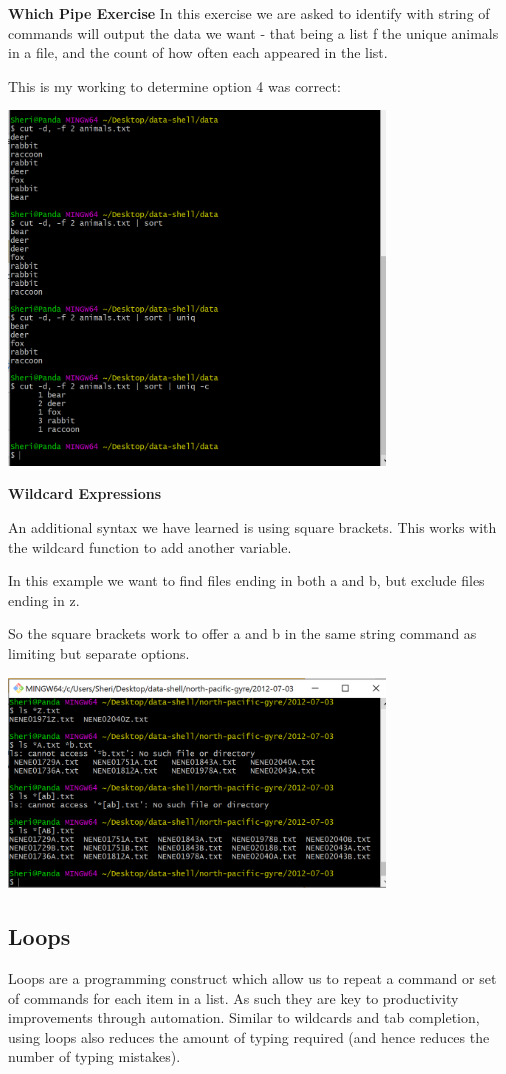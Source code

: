 \documentclass{article}
\begin{document}
\textbf{Which Pipe Exercise}
In this exercise we are asked to identify with string of commands will output the data we want - that being a list f the unique animals in a file, and the count of how often each appeared in the list. 

This is my working to determine option 4 was correct:

\includegraphics[width=10cm]{Images/GitBash_041.PNG}

\textbf{Wildcard Expressions}

An additional syntax we have learned is using square brackets. This works with the wildcard function to add another variable. 

In this example we want to find files ending in both a and b, but exclude files ending in z. 

So the square brackets work to offer a and b in the same string command as limiting but separate options.

\includegraphics[width=10cm]{Images/GitBash_042.PNG}

\subsection{Loops}
Loops are a programming construct which allow us to repeat a command or set of commands for each item in a list. As such they are key to productivity improvements through automation. Similar to wildcards and tab completion, using loops also reduces the amount of typing required (and hence reduces the number of typing mistakes).
\end{document}
